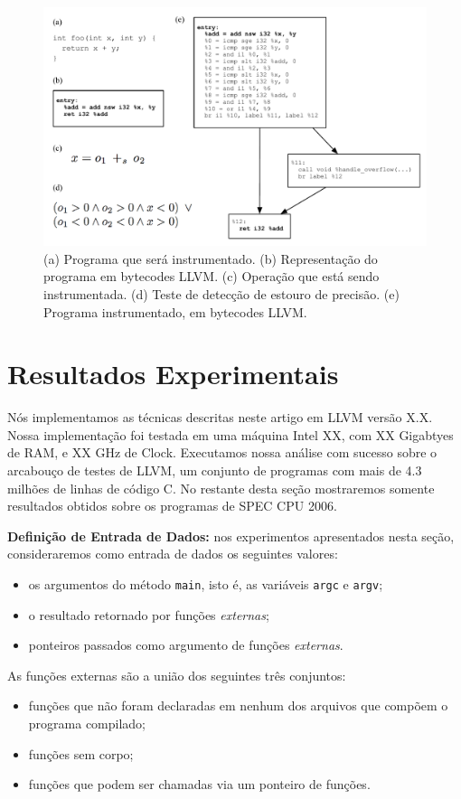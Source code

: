 \documentclass{llncs}
\begin{document}
\begin{figure}[t!]
\begin{center}
\includegraphics[width=1\textwidth]{images/instrumented_cfg}
\caption{(a) Programa que será instrumentado.
(b) Representação do programa em bytecodes LLVM.
(c) Operação que está sendo instrumentada.
(d) Teste de detecção de estouro de precisão.
(e) Programa instrumentado, em bytecodes LLVM.}
\label{fig:instrumented_cfg}
\end{center}
\end{figure}


\section{Resultados Experimentais}
\label{sec:exp}

Nós implementamos as técnicas descritas neste artigo em LLVM versão X.X.
Nossa implementação foi testada em uma máquina Intel XX, com XX Gigabtyes de
RAM, e XX GHz de Clock.
Executamos nossa análise com sucesso sobre o arcabouço de testes de LLVM,
um conjunto de programas com mais de 4.3 milhões de linhas de código C.
No restante desta seção mostraremos somente resultados obtidos sobre os
programas de SPEC CPU 2006.

\noindent
\textbf{Definição de Entrada de Dados: } nos experimentos apresentados nesta
seção, consideraremos como entrada de dados os seguintes valores:
\begin{itemize}
\item os argumentos do método \texttt{main}, isto é, as variáveis \texttt{argc}
e \texttt{argv};
\item o resultado retornado por funções {\em externas};
\item ponteiros passados como argumento de funções {\em externas}.
\end{itemize}
As funções externas são a união dos seguintes três conjuntos:
\begin{itemize}
\item funções que não foram declaradas em nenhum dos arquivos que compõem
o programa compilado;
\item funções sem corpo;
\item funções que podem ser chamadas via um ponteiro de funções.
\end{itemize}
\end{document}
